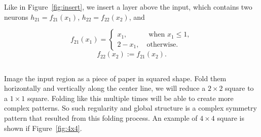 Like in Figure~\ref{fig:insert},
we insert a layer above the input,
which contains two neurons
$h_{21}=f_{21}(x_1)$,
$h_{22}=f_{22}(x_2)$, and

\begin{equation}
    f_{21}(x_1) = \begin{cases}
            x_1, \quad\quad\quad \text{when }x_1\le 1, \\
            2-x_1, \quad \text{otherwise}.
        \end{cases}
\end{equation}
\begin{equation}
    f_{22}(x_2) := f_{21}(x_2).
\end{equation}

\subsection{} %

Image the input region as a piece of paper in squared shape.
Fold them horizontally and vertically along the center line,
we will reduce a $2\times 2$ square to a $1\times 1$ square.
Folding like this multiple times will be able to create more
complex patterns.
So such regularity and global structure is a complex symmetry pattern
that resulted from this folding process.
An example of $4\times 4$ square is shown if Figure~\ref{fig:4x4}.

\subsection{} %
